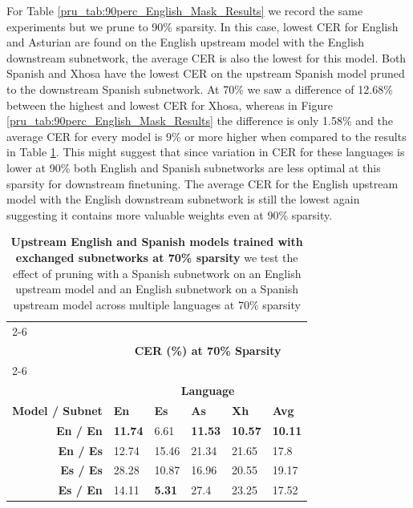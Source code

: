 For Table \ref{pru_tab:90perc_English_Mask_Results} we record the same experiments but we prune to 90\% sparsity. In this case, lowest CER for English and Asturian are found on the English upstream model with the English downstream subnetwork, the average CER is also the lowest for this model. Both Spanish and Xhosa have the lowest CER on the upstream Spanish model pruned to the downstream Spanish subnetwork. At 70\% we saw a difference of 12.68\% between the highest and lowest CER for Xhosa, whereas in Figure \ref{pru_tab:90perc_English_Mask_Results} the difference is only 1.58\% and the average CER for every model is 9\% or more higher when compared to the results in Table \ref{pru_tab:70perc_English_Mask_Results}. This might suggest that since variation in CER for these languages is lower at 90\% both English and Spanish subnetworks are less optimal at this sparsity for downstream finetuning. The average CER for the English upstream model with the English downstream subnetwork is still the lowest again suggesting it contains more valuable weights even at 90\% sparsity.


\begin{table}
\centering
\begin{tabular}{llllll}
& \\ \cline{2-6} \\[-2.3ex] 
& \multicolumn{5}{c}{\textbf{CER (\%) at 70\% Sparsity}}  \\[0.75ex] \cline{2-6} \\[-2.35ex]
& \multicolumn{5}{c}{\textbf{Language}}  \\[0.5ex] \hline
\multicolumn{1}{l|}{\textbf{Model / Subnet}} & \multicolumn{1}{l}{\textbf{En}} & \multicolumn{1}{l}{\textbf{Es}} & \multicolumn{1}{l}{\textbf{As}} & \multicolumn{1}{l}{\textbf{Xh}} & \multicolumn{1}{l}{\textbf{Avg}} \\ \hline
\multicolumn{1}{r|}{\textbf{En / En}} & \multicolumn{1}{l}{\textbf{11.74}} & \multicolumn{1}{l}{6.61} & \multicolumn{1}{l}{\textbf{11.53}} & \multicolumn{1}{l}{\textbf{10.57}} & \textbf{10.11}  \\ %
\multicolumn{1}{r|}{\textbf{En / Es}} & \multicolumn{1}{l}{12.74} & \multicolumn{1}{l}{15.46} & \multicolumn{1}{l}{21.34} & \multicolumn{1}{l}{21.65} & 17.8 \\ %
\multicolumn{1}{r|}{\textbf{Es / Es}} & \multicolumn{1}{l}{{28.28}} & \multicolumn{1}{l}{10.87} & \multicolumn{1}{l}{16.96} & \multicolumn{1}{l}{20.55} & 19.17 \\ %
\multicolumn{1}{r|}{\textbf{Es / En}} & \multicolumn{1}{l}{14.11} & \multicolumn{1}{l}{\textbf{5.31}} & \multicolumn{1}{l}{27.4} & \multicolumn{1}{l}{23.25} & 17.52 \\ \hline
\end{tabular}
\caption{\textbf{Upstream English and Spanish models trained with exchanged subnetworks at 70\% sparsity} we test the effect of pruning with a Spanish subnetwork on an English upstream model and an English subnetwork on a Spanish upstream model across multiple languages at 70\% sparsity }%
\label{pru_tab:70perc_English_Mask_Results}
\end{table}


